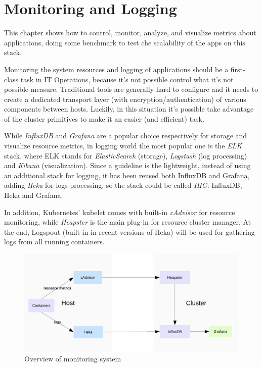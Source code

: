 \chapter{Monitoring and Logging}\label{monitoring-and-logging}

This chapter shows how to control, monitor, analyze, and visualize
metrics about applications, doing some benchmark to test che scalability
of the apps on this stack.

Monitoring the system resources and logging of applications should be a
first-class task in IT Operations, because it's not possible control
what it's not possible measure. Traditional tools are generally hard to
configure and it needs to create a dedicated transport layer (with
encryption/authentication) of various components between hosts. Luckily,
in this situation it's possible take advantage of the cluster primitives
to make it an easier (and efficient) task.

While \emph{InfluxDB} and \emph{Grafana} are a popular choice
respectively for storage and visualize resource metrics, in logging
world the most popular one is the \emph{ELK} stack, where ELK stands for
\emph{ElasticSearch} (storage), \emph{Logstash} (log processing) and
\emph{Kibana} (visualization). Since a guideline is the lightweight,
instead of using an additional stack for logging, it has been reused
both InfluxDB and Grafana, adding \emph{Heka} for logs processing, so
the stack could be called \emph{IHG}: InfluxDB, Heka and Grafana.

In addition, Kubernetes' kubelet comes with built-in \emph{cAdvisor} for
resource monitoring, while \emph{Heapster} is the main plug-in for
resource cluster manager. At the end, Logspout (built-in in recent
versions of Heka) will be used for gathering logs from all running
containers.

\begin{figure}[htbp]
\centering
\includegraphics{media/ch6-overview.png}
\caption{Overview of monitoring system}
\end{figure}

